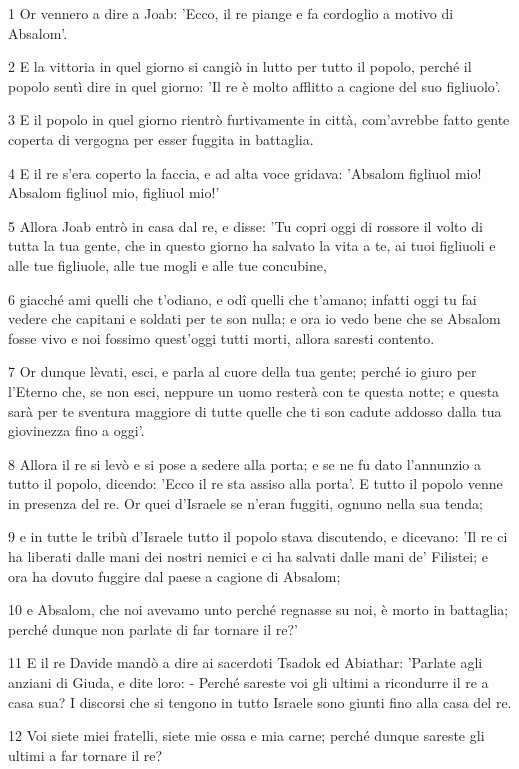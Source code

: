\par 1 Or vennero a dire a Joab: 'Ecco, il re piange e fa cordoglio a motivo di Absalom'.
\par 2 E la vittoria in quel giorno si cangiò in lutto per tutto il popolo, perché il popolo sentì dire in quel giorno: 'Il re è molto afflitto a cagione del suo figliuolo'.
\par 3 E il popolo in quel giorno rientrò furtivamente in città, com'avrebbe fatto gente coperta di vergogna per esser fuggita in battaglia.
\par 4 E il re s'era coperto la faccia, e ad alta voce gridava: 'Absalom figliuol mio! Absalom figliuol mio, figliuol mio!'
\par 5 Allora Joab entrò in casa dal re, e disse: 'Tu copri oggi di rossore il volto di tutta la tua gente, che in questo giorno ha salvato la vita a te, ai tuoi figliuoli e alle tue figliuole, alle tue mogli e alle tue concubine,
\par 6 giacché ami quelli che t'odiano, e odî quelli che t'amano; infatti oggi tu fai vedere che capitani e soldati per te son nulla; e ora io vedo bene che se Absalom fosse vivo e noi fossimo quest'oggi tutti morti, allora saresti contento.
\par 7 Or dunque lèvati, esci, e parla al cuore della tua gente; perché io giuro per l'Eterno che, se non esci, neppure un uomo resterà con te questa notte; e questa sarà per te sventura maggiore di tutte quelle che ti son cadute addosso dalla tua giovinezza fino a oggi'.
\par 8 Allora il re si levò e si pose a sedere alla porta; e se ne fu dato l'annunzio a tutto il popolo, dicendo: 'Ecco il re sta assiso alla porta'. E tutto il popolo venne in presenza del re. Or quei d'Israele se n'eran fuggiti, ognuno nella sua tenda;
\par 9 e in tutte le tribù d'Israele tutto il popolo stava discutendo, e dicevano: 'Il re ci ha liberati dalle mani dei nostri nemici e ci ha salvati dalle mani de' Filistei; e ora ha dovuto fuggire dal paese a cagione di Absalom;
\par 10 e Absalom, che noi avevamo unto perché regnasse su noi, è morto in battaglia; perché dunque non parlate di far tornare il re?'
\par 11 E il re Davide mandò a dire ai sacerdoti Tsadok ed Abiathar: 'Parlate agli anziani di Giuda, e dite loro: - Perché sareste voi gli ultimi a ricondurre il re a casa sua? I discorsi che si tengono in tutto Israele sono giunti fino alla casa del re.
\par 12 Voi siete miei fratelli, siete mie ossa e mia carne; perché dunque sareste gli ultimi a far tornare il re?
